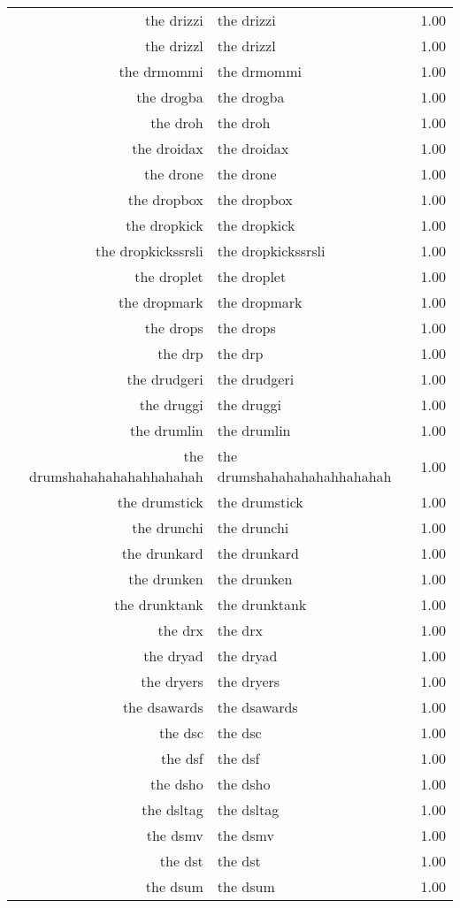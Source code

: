 \begin{table}[ht]
\begin{tabular}{rlr}
  the drizzi & the drizzi & 1.00 \\ 
  the drizzl & the drizzl & 1.00 \\ 
  the drmommi & the drmommi & 1.00 \\ 
  the drogba & the drogba & 1.00 \\ 
  the droh & the droh & 1.00 \\ 
  the droidax & the droidax & 1.00 \\ 
  the drone & the drone & 1.00 \\ 
  the dropbox & the dropbox & 1.00 \\ 
  the dropkick & the dropkick & 1.00 \\ 
  the dropkickssrsli & the dropkickssrsli & 1.00 \\ 
  the droplet & the droplet & 1.00 \\ 
  the dropmark & the dropmark & 1.00 \\ 
  the drops & the drops & 1.00 \\ 
  the drp & the drp & 1.00 \\ 
  the drudgeri & the drudgeri & 1.00 \\ 
  the druggi & the druggi & 1.00 \\ 
  the drumlin & the drumlin & 1.00 \\ 
  the drumshahahahahahhahahah & the drumshahahahahahhahahah & 1.00 \\ 
  the drumstick & the drumstick & 1.00 \\ 
  the drunchi & the drunchi & 1.00 \\ 
  the drunkard & the drunkard & 1.00 \\ 
  the drunken & the drunken & 1.00 \\ 
  the drunktank & the drunktank & 1.00 \\ 
  the drx & the drx & 1.00 \\ 
  the dryad & the dryad & 1.00 \\ 
  the dryers & the dryers & 1.00 \\ 
  the dsawards & the dsawards & 1.00 \\ 
  the dsc & the dsc & 1.00 \\ 
  the dsf & the dsf & 1.00 \\ 
  the dsho & the dsho & 1.00 \\ 
  the dsltag & the dsltag & 1.00 \\ 
  the dsmv & the dsmv & 1.00 \\ 
  the dst & the dst & 1.00 \\ 
  the dsum & the dsum & 1.00 \\ 

\end{tabular}
\end{table}
